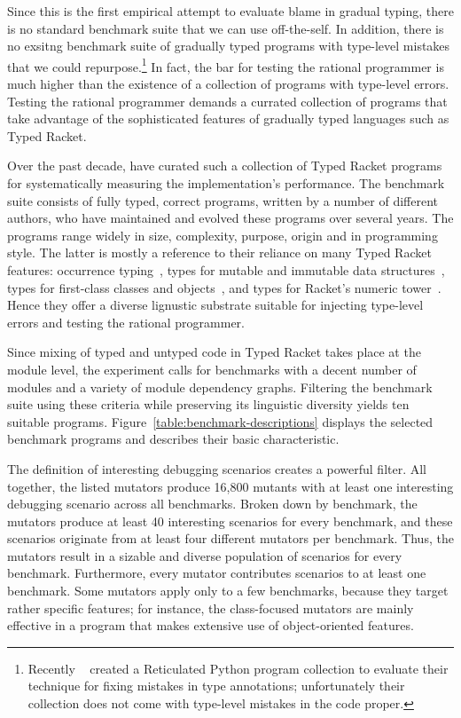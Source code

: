 
Since this is the first empirical attempt to evaluate blame in gradual
typing, there is no standard benchmark suite that we can use off-the-self.
In addition, there is no exsitng benchmark suite of gradually typed
programs with type-level mistakes that we could
repurpose.\footnote{Recently ~\citet{cc-oopsla-20} created a
Reticulated Python program collection to evaluate their technique for
fixing mistakes in type annotations; unfortunately their collection does
not come with type-level mistakes in the code proper.} In fact, the bar
for testing the rational programmer is much higher than the existence of a
collection of programs with type-level errors. Testing the rational
programmer demands a currated collection of programs that take advantage
of the sophisticated features of gradually typed languages such as Typed
Racket. 

Over the past decade,  \citet{gtnffvf-jfp-2019} have curated such a
collection of Typed Racket programs for systematically measuring the
implementation's performance. The benchmark suite consists of fully typed,
correct programs, written by a number of different authors, who have
maintained and evolved these programs over several years. The programs
range widely in size, complexity, purpose, origin and in programming
style. The latter is mostly a reference to their reliance on many Typed
Racket features: occurrence typing~\cite{tf-icfp-2010}, types for mutable
and immutable data structures~\cite{hpst-sfp-2010}, types for first-class
classes and objects~\cite{tsdtf-oopsla-2012}, and types for Racket's
numeric tower~\cite{stathff-padl-12}. Hence they offer a diverse lignustic
substrate suitable for injecting type-level errors and testing the
rational programmer. 

Since mixing of typed and untyped code in Typed Racket takes place at the
module level, the experiment calls for benchmarks with a decent number of
modules and a variety of module dependency graphs. Filtering the benchmark
suite using these criteria while preserving its linguistic diversity
yields ten suitable programs. Figure~\ref{table:benchmark-descriptions}
displays the selected benchmark programs and describes their basic
characteristic. 

The definition of interesting debugging scenarios creates a powerful filter. All
together, the listed mutators produce 16,800 mutants with at least one
interesting debugging scenario across all benchmarks.  Broken down by benchmark,
the mutators produce at least 40 interesting scenarios for every benchmark, and
these scenarios originate from at least four different mutators per benchmark.
Thus, the mutators result in a sizable and diverse population of scenarios for
every benchmark.  Furthermore, every mutator contributes scenarios to at least
one benchmark.  Some mutators apply only to a few benchmarks, because they
target rather specific features; for instance, the class-focused mutators are
mainly effective in a program that makes extensive use of object-oriented
features.
